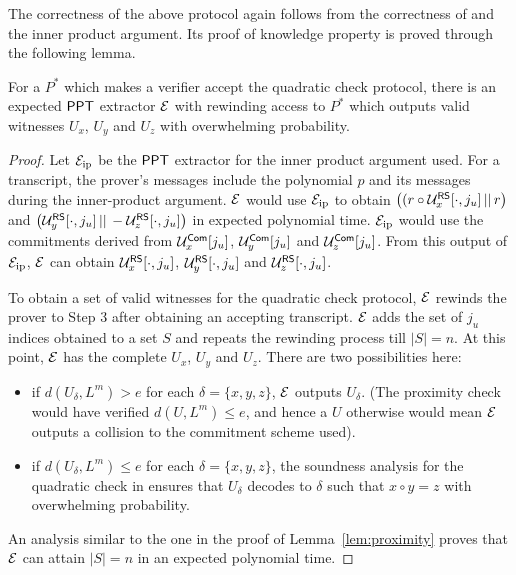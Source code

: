 The correctness of the above protocol again follows from the correctness of \cite{Ligero} and the inner product argument. Its proof of knowledge property is proved through the following lemma.
\begin{lemma}
For a $P^*$ which makes a verifier accept the quadratic check protocol, there is an expected $\mathsf{PPT}$ extractor $\mathcal{E}$ with rewinding access to $P^*$ which outputs valid witnesses $U_x$, $U_y$ and $U_z$ with overwhelming probability.
\end{lemma}
\begin{proof}
Let $\mathcal{E}_{\mathrm{ip}}$ be the $\mathsf{PPT}$ extractor for the inner product argument used. For a transcript, the prover's messages include the polynomial $p$ and its messages during the inner-product argument.
$\mathcal{E}$ would use $\mathcal{E}_{\mathrm{ip}}$ to obtain $\left( (r \circ \mathcal{U}^{\mathsf{RS}}_x[\cdot,j_u] \, || \, r \right)$ and $\left( \mathcal{U}^{\mathsf{RS}}_y[\cdot,j_u] \, || \, -\mathcal{U}^{\mathsf{RS}}_z[\cdot,j_u] \right)$ in expected polynomial time. $\mathcal{E}_{\mathrm{ip}}$ would use the commitments derived from $\mathcal{U}^{\mathsf{Com}}_x[j_u]$, $\mathcal{U}^{\mathsf{Com}}_y[j_u]$ and $\mathcal{U}^{\mathsf{Com}}_z[j_u]$. From this output of $\mathcal{E}_{\mathrm{ip}}$, $\mathcal{E}$ can obtain $\mathcal{U}^{\mathsf{RS}}_x[\cdot,j_u]$, $\mathcal{U}^{\mathsf{RS}}_y[\cdot,j_u]$ and $\mathcal{U}^{\mathsf{RS}}_z[\cdot,j_u]$.

To obtain a set of valid witnesses for the quadratic check protocol, $\mathcal{E}$ rewinds the prover to Step 3 after obtaining an accepting transcript. $\mathcal{E}$ adds the set of $j_u$ indices obtained to a set $S$ and repeats the rewinding process till $|S| = n$. At this point, $\mathcal{E}$ has the complete $U_x$, $U_y$ and $U_z$. There are two possibilities here:
\begin{itemize}
\item if $d(U_\delta,L^m) > e$ for each $\delta = \{x, y, z\}$, $\mathcal{E}$ outputs $U_\delta$. (The proximity check would have verified $d(U,L^m) \leq e$, and hence a $U$ otherwise would mean $\mathcal{E}$ outputs a collision to the commitment scheme used).
\item if $d(U_\delta,L^m) \leq e$ for each $\delta = \{x, y, z\}$, the soundness analysis for the quadratic check in \cite{Ligero} ensures that $U_\delta$ decodes to $\delta$ such that $x\circ y = z$ with overwhelming probability.
\end{itemize}
An analysis similar to the one in the proof of Lemma~\ref{lem:proximity} proves that $\mathcal{E}$ can attain $|S| = n$ in an expected polynomial time.
\end{proof}
